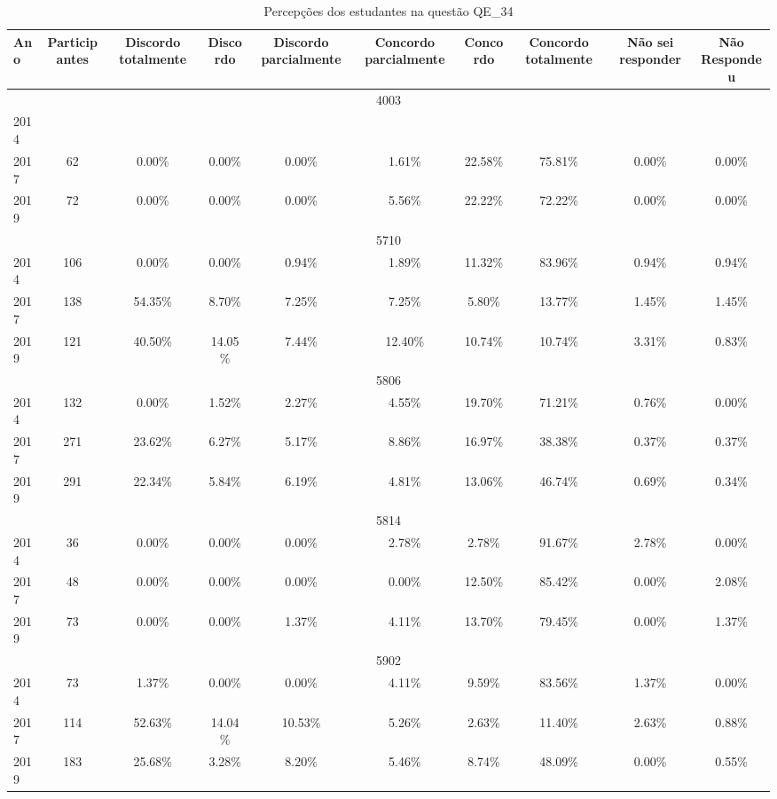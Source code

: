 \begin{table}[H]
\centering
\caption{Percepções dos estudantes na questão QE\_34}
\begin{tabular}{|l|c|ccc|ccc|cc|}
\hline
\toprule
Ano & Participantes & Discordo totalmente & Discordo & Discordo parcialmente & Concordo parcialmente & Concordo & Concordo totalmente & Não sei responder & Não Respondeu \\
\midrule
\hline
\multicolumn{10}{|c|}{4003}\\
\hline
2014 & & & & & & & & & \\
2017 & 62 & 0.00\% & 0.00\% & 0.00\% & 1.61\% & 22.58\% & 75.81\% & 0.00\% & 0.00\%\\
2019 & 72 & 0.00\% & 0.00\% & 0.00\% & 5.56\% & 22.22\% & 72.22\% & 0.00\% & 0.00\%\\
\hline
\hline
\multicolumn{10}{|c|}{5710}\\
\hline
2014 & 106 & 0.00\% & 0.00\% & 0.94\% & 1.89\% & 11.32\% & 83.96\% & 0.94\% & 0.94\%\\
2017 & 138 & 54.35\% & 8.70\% & 7.25\% & 7.25\% & 5.80\% & 13.77\% & 1.45\% & 1.45\%\\
2019 & 121 & 40.50\% & 14.05\% & 7.44\% & 12.40\% & 10.74\% & 10.74\% & 3.31\% & 0.83\%\\
\hline
\hline
\multicolumn{10}{|c|}{5806}\\
\hline
2014 & 132 & 0.00\% & 1.52\% & 2.27\% & 4.55\% & 19.70\% & 71.21\% & 0.76\% & 0.00\%\\
2017 & 271 & 23.62\% & 6.27\% & 5.17\% & 8.86\% & 16.97\% & 38.38\% & 0.37\% & 0.37\%\\
2019 & 291 & 22.34\% & 5.84\% & 6.19\% & 4.81\% & 13.06\% & 46.74\% & 0.69\% & 0.34\%\\
\hline
\hline
\multicolumn{10}{|c|}{5814}\\
\hline
2014 & 36 & 0.00\% & 0.00\% & 0.00\% & 2.78\% & 2.78\% & 91.67\% & 2.78\% & 0.00\%\\
2017 & 48 & 0.00\% & 0.00\% & 0.00\% & 0.00\% & 12.50\% & 85.42\% & 0.00\% & 2.08\%\\
2019 & 73 & 0.00\% & 0.00\% & 1.37\% & 4.11\% & 13.70\% & 79.45\% & 0.00\% & 1.37\%\\
\hline
\hline
\multicolumn{10}{|c|}{5902}\\
\hline
2014 & 73 & 1.37\% & 0.00\% & 0.00\% & 4.11\% & 9.59\% & 83.56\% & 1.37\% & 0.00\%\\
2017 & 114 & 52.63\% & 14.04\% & 10.53\% & 5.26\% & 2.63\% & 11.40\% & 2.63\% & 0.88\%\\
2019 & 183 & 25.68\% & 3.28\% & 8.20\% & 5.46\% & 8.74\% & 48.09\% & 0.00\% & 0.55\%\\

\end{tabular}
\end{table}
